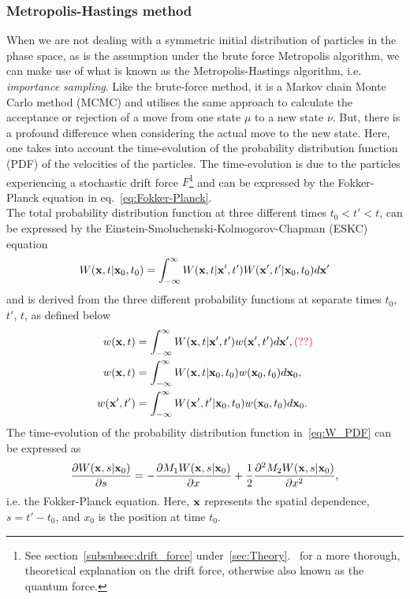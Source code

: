 \documentclass[
    a4paper, aps, twocolumn, floatfix, superscriptaddress,
    nofootinbib]{revtex4-1}
\begin{document}
\subsubsection{Metropolis-Hastings method}\label{subsubsec:Metropolis-Hastings} When we are not dealing with a symmetric initial distribution of particles in the phase space, as is the assumption under the brute force Metropolis algorithm, we can make use of what is known as the Metropolis-Hastings algorithm, i.e. \textit{importance sampling}. Like the brute-force method, it is a Markov chain Monte Carlo method (MCMC) and utilises the same approach to calculate the acceptance or rejection of a move from one state $\mu$ to a new state $\nu$. But, there is a profound difference when considering the actual move to the new state. Here, one takes into account the time-evolution of the probability distribution function (PDF) of the velocities of the particles. The time-evolution is due to the particles experiencing a stochastic drift force $F$\footnote{See section~\ref{subsubsec:drift_force} under~\ref{sec:Theory}.~ for a more thorough, theoretical explanation on the drift force, otherwise also known as the quantum force.} and can be expressed by the Fokker-Planck equation in eq.~\ref{eq:Fokker-Planck}. \\

\indent The total probability distribution function at three different times $t_0 < t' < t$, can be expressed by the Einstein-Smoluchenski-Kolmogorov-Chapman (ESKC) equation
\begin{align}
    W(\bold x, t | \bold x_0, t_0) = \int_{-\infty}^\infty W(\bold x, t | \bold x', t')W(\bold x', t' | \bold x_0, t_0)d\bold x' \label{eq:W_PDF}
\end{align}
and is derived from the three different probability functions at separate times $t_0$, $t'$, $t$, as defined below
\begin{align*}
    w(\bold x, t) &= \int_{-\infty}^\infty W(\bold x, t | \bold x', t') w(\bold x', t')d\bold x', \textcolor{red}{(??)}\\
    w(\bold x, t) &= \int_{-\infty}^\infty W(\bold x, t | \bold x_0, t_0) w(\bold x_0, t_0)d\bold x_0, \\
    w(\bold x', t') &= \int_{-\infty}^\infty W(\bold x', t' | \bold x_0, t_0) w(\bold x_0, t_0)d\bold x_0.
\end{align*}
The time-evolution of the probability distribution function in~\eqref{eq:W_PDF} can be expressed as
\begin{align}
    \frac{\partial W(\bold x, s | \bold x_0)}{\partial s} = -\frac{\partial M_1 W(\bold x, s | \bold x_0)}{\partial x} + \frac{1}{2}\frac{\partial^2 M_2 W(\bold x, s | \bold x_0)}{\partial x^2} \label{eq:Fokker-Planck},
\end{align}
i.e. the Fokker-Planck equation. Here, $\bold x$ represents the spatial dependence, $s = t' - t_0$, and $x_0$ is the  position at time $t_0$.
\end{document}
